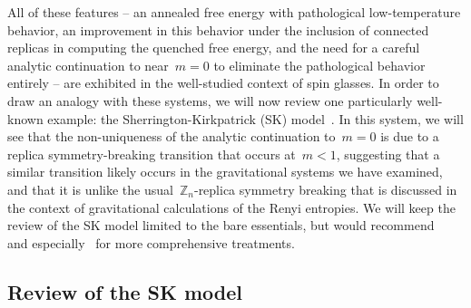 \documentclass[12pt]{article}
\begin{document}
All of these features -- an annealed free energy with pathological low-temperature behavior, an improvement in this behavior under the inclusion of connected replicas in computing the quenched free energy, and the need for a careful analytic continuation to near~$m = 0$ to eliminate the pathological behavior entirely -- are exhibited in the well-studied context of spin glasses.  In order to draw an analogy with these systems, we will now review one particularly well-known example: the Sherrington-Kirkpatrick (SK) model~\cite{SheKir75}.  In this system, we will see that the non-uniqueness of the analytic continuation to~$m = 0$ is due to a replica symmetry-breaking transition that occurs at~$m < 1$, suggesting that a similar transition likely occurs in the gravitational systems we have examined, and that it is unlike the usual~$\mathbb{Z}_{n}$-replica symmetry breaking that is discussed in the context of gravitational calculations of the Renyi entropies.  We will keep the review of the SK model limited to the bare essentials, but would recommend~\cite{SherringtonReview,CasCavReview} and especially~\cite{SpinGlassBook} for more comprehensive treatments.


\subsection{Review of the SK model}
\end{document}
